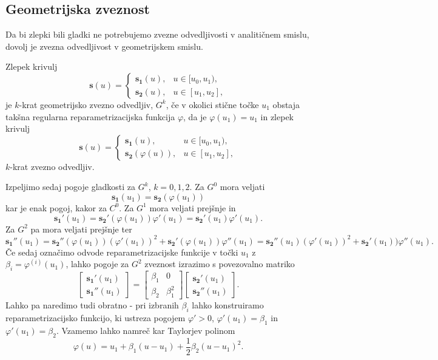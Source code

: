 \documentclass[isrm2, tisk]{fmfdelo}
\begin{document}
    \subsection{Geometrijska zveznost}
    Da bi zlepki bili gladki ne potrebujemo zvezne odvedljivosti v analitičnem smislu, dovolj je zvezna odvedljivost v geometrijskem smislu.
    \begin{definicija}
        \label{def:geometrijska-zveznost}
        Zlepek krivulj \[\mathbf{s}(u) = \begin{cases}
                                             \mathbf{s_1}(u), & u \in [u_0,u_1),  \\
                                             \mathbf{s_2}(u), & u \in [u_1,u_2],
        \end{cases}\] je $k$-krat geometrijsko zvezno odvedljiv, $G^k$, če v okolici stične točke $u_1$ obstaja takšna regularna reparametrizacijska funkcija $\varphi$, da je $\varphi(u_1)=u_1$ in zlepek krivulj
        \[\mathbf{s}(u) = \begin{cases}
                              \mathbf{s_1}(u), & u \in [u_0,u_1),  \\
                              \mathbf{s_2}(\varphi(u)), & u \in [u_1,u_2],
        \end{cases}\]
        $k$-krat zvezno odvedljiv.
    \end{definicija}
    \noindent Izpeljimo sedaj pogoje gladkosti za $G^k$, $k=0,1,2$.
    Za $G^0$ mora veljati $$\mathbf{s_1}(u_1) =  \mathbf{s_2}(\varphi(u_1))$$ kar je enak pogoj, kakor za $C^0$.
    Za $G^1$ mora veljati prejšnje in $$ \mathbf{s_1'}(u_1) = \mathbf{s_2'}(\varphi(u_1))\varphi'(u_1) = \mathbf{s_2'}(u_1)\varphi'(u_1).$$
    Za $G^2$ pa mora veljati prejšnje ter $$\mathbf{s_1''}(u_1) = \mathbf{s_2''}(\varphi(u_1))(\varphi'(u_1))^2 +  \mathbf{s_2'}(\varphi(u_1))\varphi''(u_1) =\mathbf{s_2''}(u_1)(\varphi'(u_1))^2 +  \mathbf{s_2'}(u_1))\varphi''(u_1).$$
    Če sedaj označimo odvode reparametrizacijske funkcije v točki $u_1$ z $\beta_i = \varphi^{(i)}(u_1)$, lahko pogoje za $G^2$ zveznost izrazimo s povezovalno matriko
    $$
    \begin{bmatrix}
        \mathbf{s_1'}(u_1) \\
        \mathbf{s_1''}(u_1)
    \end{bmatrix}
    =
    \begin{bmatrix}
        \beta_1 & 0         \\
        \beta_2 & \beta_1^2
    \end{bmatrix}  \begin{bmatrix}
                       \mathbf{s_2'}(u_1) \\
                       \mathbf{s_2''}(u_1)
    \end{bmatrix}.$$
    Lahko pa naredimo tudi obratno - pri izbranih $\beta_i$ lahko konstruiramo reparametrizacijsko funkcijo, ki ustreza pogojem $\varphi'>0$,  $\varphi'(u_1)=\beta_1$ in $\varphi'(u_1)=\beta_2$. Vzamemo lahko namreč kar Taylorjev polinom
    $$\varphi(u) = u_1 + \beta_1(u-u_1) + \frac{1}{2}\beta_2(u-u_1)^2.$$
\end{document}
